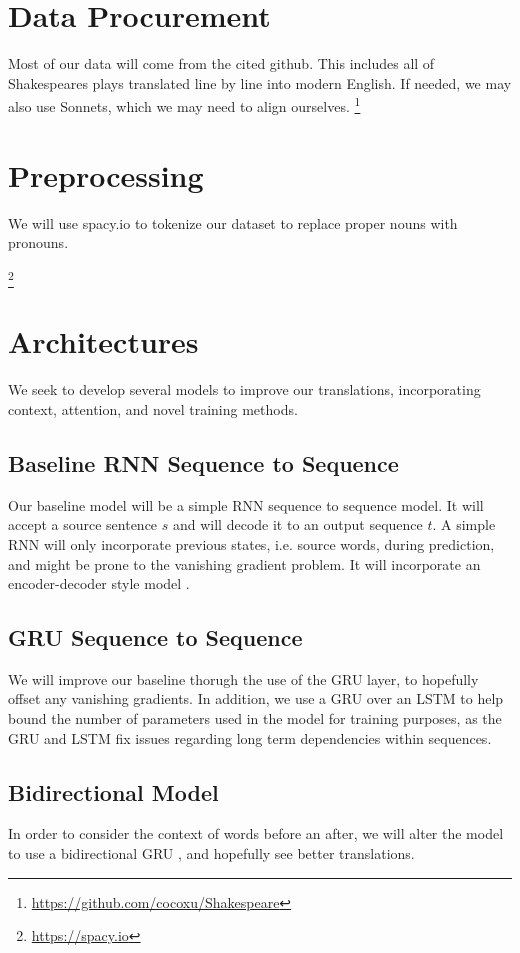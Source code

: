 \documentclass[twoside,twocolumn]{article}
\begin{document}
\section{Data Procurement}
Most of our data will come from the cited github. This includes all of Shakespeares plays translated line by line into modern English. If needed, we may also use Sonnets, which we may need to align ourselves. 
\footnote{\url{https://github.com/cocoxu/Shakespeare}}

\section{Preprocessing}
We will use spacy.io to tokenize our dataset to replace proper nouns with pronouns. 

\footnote{\url{https://spacy.io}}
\section{Architectures}
We seek to develop several models to improve our translations, incorporating context, attention, and novel training methods.

\subsection{Baseline RNN Sequence to Sequence}
Our baseline model will be a simple RNN sequence to sequence model. It will accept a source sentence $s$ and will decode it to an output sequence $t$. A simple RNN will only incorporate previous states, i.e. source words, during prediction, and might be prone to the vanishing gradient problem. It will incorporate an encoder-decoder style model \cite{cho2014learning} \cite{sutskever2014sequence}.
\subsection{GRU Sequence to Sequence}
We will improve our baseline thorugh the use of the GRU layer, to hopefully offset any vanishing gradients. In addition, we use a GRU over an LSTM to help bound the number of parameters used in the model for training purposes, as the GRU and LSTM fix issues regarding long term dependencies within sequences.
\subsection{Bidirectional Model}
In order to consider the context of words before an after, we will alter the model to use a bidirectional GRU \cite{bahdanau2014neural}, and hopefully see better translations.
\end{document}

